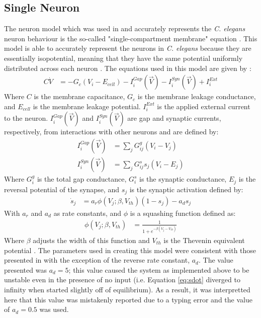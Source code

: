 \documentclass[11pt]{article} %
\begin{document}
\subsection{Single Neuron}
The neuron model which was used in \cite{Kunert2014} and accurately represents the \emph{C. elegans} neuron behaviour is the so-called "single-compartment membrane" equation \cite{Kunert2014, Wicks1996a}. This model is able to accurately represent the neurons in \emph{C. elegans} because they are essentially isopotential, meaning that they have the same potential uniformly distributed across each neuron \cite{Goodman1998}. The equations used in this model are given by \cite{Kunert2014}:
\begin{align}
C \dot{V} &= -G_c(V_i - E_{cell}) - I_i^{Gap}(\vec{V}) - I_i^{Syn}(\vec{V}) + I_i^{Ext}
\end{align}
Where $C$ is the membrane capacitance, $G_c$ is the membrane leakage conductance, and $E_{cell}$ is the membrane leakage potential. $I_i^{Ext}$ is the applied external current to the neuron. $I_i^{Gap}(\vec{V})$ and $I_i^{Syn}(\vec{V})$ are gap and synaptic currents, respectively, from interactions with other neurons and are defined by:
\begin{align}
I_i^{Gap}(\vec{V}) &= \sum_j G_{ij}^g(V_i - V_j) \\
I_i^{Syn}(\vec{V}) &= \sum_j G_{ij}^s s_j(V_i - E_j)
\end{align}
Where $G_i^g$ is the total gap conductance, $G_i^s$ is the synaptic conductance, $E_j$ is the reversal potential of the synapse, and $s_j$ is the synaptic activation defined by:
\begin{align} \label{eq:sdot}
\dot{s}_j &= a_r \phi (V_j; \beta, V_{th})(1-s_j) - a_d s_j
\end{align}
With $a_r$ and $a_d$ as rate constants, and $\phi$ is a squashing function defined as:
\begin{align} 
\phi (V_j; \beta, V_{th}) &= \frac{1}{1+ e^{-\beta(V_j - V_{th})}}
\end{align}
Where $\beta$ adjusts the width of this function and $V_{th}$ is the Thevenin equivalent potential \cite{Wicks1996a}. The parameters used in creating this model were consistent with those presented in \cite{Kunert2014} with the exception of the reverse rate constant, $a_d$. The value presented was $a_d=5$; this value caused the system as implemented above to be unstable even in the presence of no input (i.e. Equation \ref{eq:sdot} diverged to infinity when started slightly off of equilibrium). As a result, it was interpretted here that this value was mistakenly reported due to a typing error and the value of $a_d = 0.5$ was used.
\end{document}
